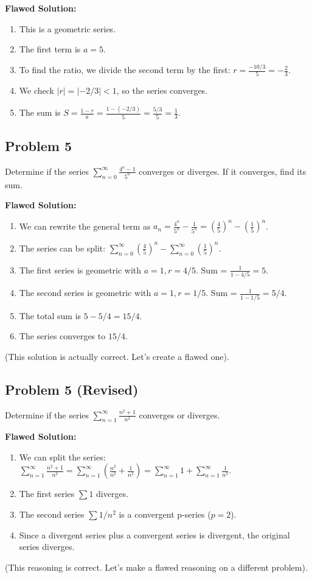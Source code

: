 \documentclass{article}
\begin{document}
\textbf{Flawed Solution:}
\begin{enumerate}
    \item This is a geometric series.
    \item The first term is $a = 5$.
    \item To find the ratio, we divide the second term by the first: $r = \frac{-10/3}{5} = -\frac{2}{3}$.
    \item We check $|r|=|-2/3| < 1$, so the series converges.
    \item The sum is $S = \frac{1-r}{a} = \frac{1 - (-2/3)}{5} = \frac{5/3}{5} = \frac{1}{3}$.
\end{enumerate}

\subsection*{Problem 5}
Determine if the series $\sum_{n=0}^{\infty} \frac{4^n - 1}{5^n}$ converges or diverges. If it converges, find its sum.

\textbf{Flawed Solution:}
\begin{enumerate}
    \item We can rewrite the general term as $a_n = \frac{4^n}{5^n} - \frac{1}{5^n} = (\frac{4}{5})^n - (\frac{1}{5})^n$.
    \item The series can be split: $\sum_{n=0}^{\infty} (\frac{4}{5})^n - \sum_{n=0}^{\infty} (\frac{1}{5})^n$.
    \item The first series is geometric with $a=1, r=4/5$. Sum = $\frac{1}{1-4/5} = 5$.
    \item The second series is geometric with $a=1, r=1/5$. Sum = $\frac{1}{1-1/5} = 5/4$.
    \item The total sum is $5 - 5/4 = 15/4$.
    \item The series converges to $15/4$.
\end{enumerate}
(This solution is actually correct. Let's create a flawed one).

\subsection*{Problem 5 (Revised)}
Determine if the series $\sum_{n=1}^{\infty} \frac{n^2+1}{n^2}$ converges or diverges.

\textbf{Flawed Solution:}
\begin{enumerate}
    \item We can split the series: $\sum_{n=1}^{\infty} \frac{n^2+1}{n^2} = \sum_{n=1}^{\infty} \left( \frac{n^2}{n^2} + \frac{1}{n^2} \right) = \sum_{n=1}^{\infty} 1 + \sum_{n=1}^{\infty} \frac{1}{n^2}$.
    \item The first series $\sum 1$ diverges.
    \item The second series $\sum 1/n^2$ is a convergent p-series ($p=2$).
    \item Since a divergent series plus a convergent series is divergent, the original series diverges.
\end{enumerate}
(This reasoning is correct. Let's make a flawed reasoning on a different problem).
\end{document}
